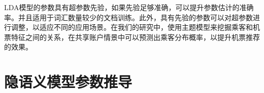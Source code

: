 LDA模型的参数具有超参数先验，如果先验足够准确，可以提升参数估计的准确率。并且适用于词汇数量较少的文档训练。此外，具有先验的参数可以对超参数进行调整，以适应不同的应用场景。在我们的研究中，使用主题模型来挖掘乘客和机票特征之间的关系，在共享账户情景中可以预测出乘客分布概率，以提升机票推荐的效果。

\section{隐语义模型参数推导}